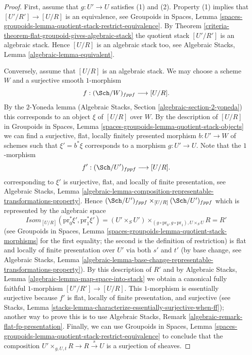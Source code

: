 \begin{proof}

First, assume that $g : U' \to U$ satisfies (1) and (2). Property (1)
implies that $[U'/R'] \to [U/R]$ is an equivalence, see
Groupoids in Spaces,
Lemma \ref{spaces-groupoids-lemma-quotient-stack-restrict-equivalence}.
By
Theorem \ref{criteria-theorem-flat-groupoid-gives-algebraic-stack}
the quotient stack $[U'/R']$ is an algebraic stack. Hence
$[U/R]$ is an algebraic stack too, see
Algebraic Stacks, Lemma \ref{algebraic-lemma-equivalent}.

\medskip\noindent
Conversely, assume that $[U/R]$ is an algebraic stack. We may choose a
scheme $W$ and a surjective smooth $1$-morphism
$$
f : (\Sch/W)_{fppf} \longrightarrow [U/R].
$$
By the $2$-Yoneda lemma
(Algebraic Stacks, Section \ref{algebraic-section-2-yoneda})
this corresponds to an object $\xi$ of $[U/R]$ over $W$.
By the description of $[U/R]$ in
Groupoids in Spaces, Lemma \ref{spaces-groupoids-lemma-quotient-stack-objects}
we can find a surjective, flat, locally finitely presented morphism
$b : U' \to W$ of schemes such that $\xi' = b^*\xi$ corresponds to a morphism
$g : U' \to U$. Note that the $1$-morphism
$$
f' : (\Sch/U')_{fppf} \longrightarrow [U/R].
$$
corresponding to $\xi'$ is surjective, flat, and locally of finite
presentation, see
Algebraic Stacks, Lemma
\ref{algebraic-lemma-composition-representable-transformations-property}.
Hence
$(\Sch/U')_{fppf} \times_{[U/R]} (\Sch/U')_{fppf}$
which is represented by the algebraic space
$$
\mathit{Isom}_{[U/R]}(\text{pr}_0^*\xi', \text{pr}_1^*\xi') =
(U' \times_S U')
\times_{(g \circ \text{pr}_0, g \circ \text{pr}_1), U \times_S U} R = R'
$$
(see
Groupoids in Spaces, Lemma
\ref{spaces-groupoids-lemma-quotient-stack-morphisms}
for the first equality; the second is the definition of restriction)
is flat and locally of finite presentation over $U'$ via both $s'$ and $t'$
(by base change, see
Algebraic Stacks, Lemma
\ref{algebraic-lemma-base-change-representable-transformations-property}).
By this description of $R'$ and by
Algebraic Stacks, Lemma \ref{algebraic-lemma-map-space-into-stack}
we obtain a canonical fully faithful $1$-morphism $[U'/R'] \to [U/R]$.
This $1$-morphism is essentially surjective because $f'$ is flat,
locally of finite presentation, and surjective (see
Stacks, Lemma \ref{stacks-lemma-characterize-essentially-surjective-when-ff});
another way to prove this is to use
Algebraic Stacks, Remark
\ref{algebraic-remark-flat-fp-presentation}.
Finally, we can use
Groupoids in Spaces, Lemma
\ref{spaces-groupoids-lemma-quotient-stack-restrict-equivalence}
to conclude that the composition
$U' \times_{g, U, t} R \to R \xrightarrow{s} U$ is a surjection of sheaves.
\end{proof}

